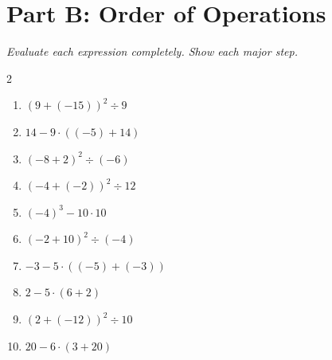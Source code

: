 \documentclass[11pt]{article}
\begin{document}
\section*{Part B: Order of Operations}
\noindent\textit{Evaluate each expression completely. Show each major step.}
\begin{multicols}{2}
\begin{enumerate}
  \item $(9 + (-15))^{2} \div 9$
  \vspace{1.3cm}
  \item $14 - 9 \cdot ((-5) + 14)$
  \vspace{1.3cm}
  \item $(-8 + 2)^{2} \div (-6)$
  \vspace{1.3cm}
  \item $(-4 + (-2))^{2} \div 12$
  \vspace{1.3cm}
  \item $(-4)^{3} - 10 \cdot 10$
  \vspace{1.3cm}
  \item $(-2 + 10)^{2} \div (-4)$
  \vspace{1.3cm}
  \item $-3 - 5 \cdot ((-5) + (-3))$
  \vspace{1.3cm}
  \item $2 - 5 \cdot (6 + 2)$
  \vspace{1.3cm}
  \item $(2 + (-12))^{2} \div 10$
  \vspace{1.3cm}
  \item $20 - 6 \cdot (3 + 20)$
  \vspace{1.3cm}
\end{enumerate}
\end{multicols}
\end{document}
